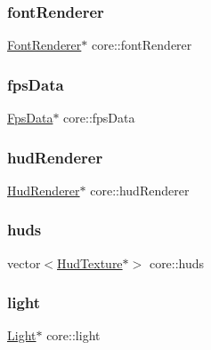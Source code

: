 \mbox{\label{namespacecore_ac8af6c1a584af6d86930b36660a73486}} 
\subsubsection{\texorpdfstring{font\+Renderer}{fontRenderer}}
{\footnotesize\ttfamily \hyperlink{classfont_1_1FontRenderer}{Font\+Renderer}$\ast$ core\+::font\+Renderer}

\mbox{\label{namespacecore_a5d5106eb67b679c9260ebe0a9faf14db}} 
\subsubsection{\texorpdfstring{fps\+Data}{fpsData}}
{\footnotesize\ttfamily \hyperlink{classutility_1_1FpsData}{Fps\+Data}$\ast$ core\+::fps\+Data}

\mbox{\label{namespacecore_aee35d512367a35873a31455fd218d84a}} 
\subsubsection{\texorpdfstring{hud\+Renderer}{hudRenderer}}
{\footnotesize\ttfamily \hyperlink{classhud_1_1HudRenderer}{Hud\+Renderer}$\ast$ core\+::hud\+Renderer}

\mbox{\label{namespacecore_ad6858d3a6f10dffc125d162eab364996}} 
\subsubsection{\texorpdfstring{huds}{huds}}
{\footnotesize\ttfamily vector$<$\hyperlink{classhud_1_1HudTexture}{Hud\+Texture}$\ast$$>$ core\+::huds}

\mbox{\label{namespacecore_a2324d96000e7c6d42570a0577e8f070b}} 
\subsubsection{\texorpdfstring{light}{light}}
{\footnotesize\ttfamily \hyperlink{classentity_1_1Light}{Light}$\ast$ core\+::light}

